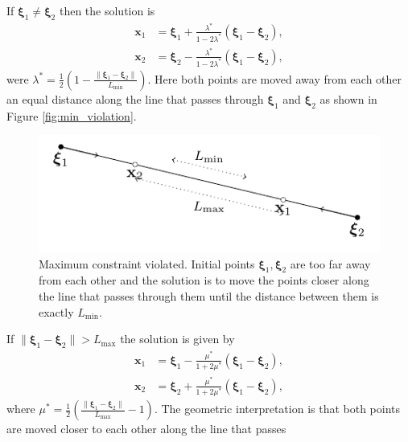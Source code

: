 %
If $\boldsymbol{\xi}_1 \neq \boldsymbol{\xi}_2$
then the solution is
%
\begin{equation}
\begin{aligned}
\textbf{x}_1 &= \boldsymbol{\xi}_1 + \frac{\lambda^*}{1 - 2\lambda^*} (\boldsymbol{\xi}_1 - \boldsymbol{\xi}_2), \\
\textbf{x}_2 &= \boldsymbol{\xi}_2 - \frac{\lambda^*}{1 - 2\lambda^*} (\boldsymbol{\xi}_1 - \boldsymbol{\xi}_2),
\end{aligned}
\label{eq:solution_min}
\end{equation}
were $ \lambda^* = \frac{1}{2} \left( 1 - \frac{\| \boldsymbol{\xi}_1 - \boldsymbol{\xi}_2 \|}{L_{\min}} \right)$.
Here both points are moved away from each other an equal distance along the line that passes through
$\boldsymbol{\xi}_1$ and $\boldsymbol{\xi}_2$ as shown in Figure \ref{fig:min_violation}.\\
%
%
\begin{figure}[H]
	\centering
	\includegraphics[]{figures/constraint_handling/well_length_max.pdf}
	\caption{Maximum constraint violated. Initial points $\boldsymbol{\xi}_1, \boldsymbol{\xi}_2$ 
	are too far away from each other and the solution is to move the points closer along the line 
	that passes through them until the distance between them is exactly $L_{\min}$.}
	\label{fig:max_violation}
\end{figure}
%
If $\| \boldsymbol{\xi}_1 - \boldsymbol{\xi}_2 \| > L_{\max}$
the solution is given by
\begin{equation}
\begin{aligned}
\textbf{x}_1 &= \boldsymbol{\xi}_1 - \frac{\mu^*}{1 + 2\mu^*} (\boldsymbol{\xi}_1 - \boldsymbol{\xi}_2), \\
\textbf{x}_2 &= \boldsymbol{\xi}_2 + \frac{\mu^*}{1 + 2\mu^*} (\boldsymbol{\xi}_1 - \boldsymbol{\xi}_2),
\end{aligned}
\label{eq:solution_max}
\end{equation}
where $\mu^* =\frac{1}{2} \left( \frac{\| \boldsymbol{\xi}_1 - \boldsymbol{\xi}_2 \|}{L_{\max}} - 1 \right) $. 
The geometric interpretation is that both points are moved closer to each other along the line that passes
